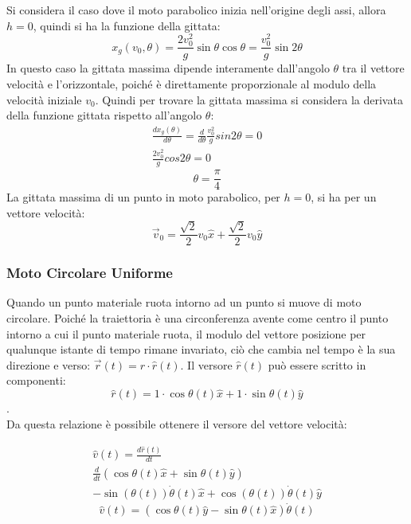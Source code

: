 \documentclass{article}
\numberwithin{equation}{subsection}
\begin{document}
Si considera il caso dove il moto parabolico inizia nell'origine 
degli assi, allora $h=0$, quindi si ha la funzione della gittata:
\begin{equation}
    x_g(v_0,\theta)=\displaystyle\frac{2v_0^2}{g}\sin\theta \cos\theta=\frac{v_0^2}{g}\sin2\theta
\end{equation}
In questo caso la gittata massima dipende interamente dall'angolo 
$\theta$ tra il vettore velocità e l'orizzontale, poiché è direttamente proporzionale al modulo della velocità iniziale $v_0$. Quindi
per trovare la gittata massima si considera la derivata della funzione gittata rispetto all'angolo $\theta$: 
\begin{gather*}
    \displaystyle\frac{dx_g(\theta)}{d\theta}=\frac{d}{d\theta}\frac{v_0^2}{g}sin2\theta=0\\
    \displaystyle\frac{2v_0^2}{g}cos2\theta=0
\end{gather*}
\begin{equation}
    \theta=\displaystyle\frac{\pi}{4}
\end{equation}
La gittata massima di un punto in moto parabolico, per $h=0$, 
si ha per un vettore velocità:
\begin{equation} 
    \vec{v}_0=\displaystyle\frac{\sqrt{2}}{2}v_0\hat{x}+\frac{\sqrt{2}}{2}v_0\hat{y}
\end{equation}

\subsubsection{Moto Circolare Uniforme}

Quando un punto materiale ruota intorno ad un punto si muove di moto circolare.
Poiché la traiettoria è una circonferenza avente come centro il 
punto intorno a cui il punto materiale ruota, il modulo del vettore posizione 
per qualunque istante di tempo rimane invariato, ciò che cambia nel tempo è 
la sua direzione e verso: $\vec{r}(t)=r\cdot\hat{r}(t)$.
Il versore $\hat{r}(t)$ può essere scritto in componenti: 
\begin{equation}
    \hat{r}(t)=1\cdot \cos\theta(t)\hat{x}+1\cdot \sin\theta(t)\hat{y}
\end{equation}.\\
Da questa relazione è possibile ottenere il versore del 
vettore velocità: 

\begin{gather*}
    \hat{v}(t)=\displaystyle\frac{d\hat{r}(t)}{dt}\\
    \displaystyle\frac{d}{dt}\left(\cos\theta(t)\hat{x}+\sin\theta(t)\hat{y}\right)\\
    -\sin(\theta(t))\dot\theta(t)\hat{x}+\cos(\theta(t))\dot\theta(t)\hat{y}
\end{gather*}
\begin{equation}
    \hat{v}(t)=\left(\cos\theta(t)\hat{y}-\sin\theta(t)\hat{x}\right)\dot\theta(t)
\end{equation}
\end{document}
